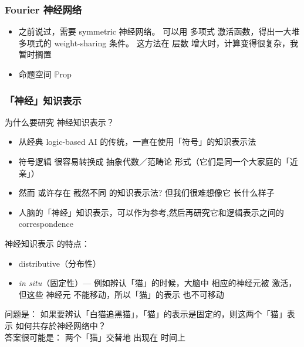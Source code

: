 \documentclass[16pt]{beamer}
\newcommand{\emp}[1]{{\color{violet}#1}}
\begin{document}
\begin{frame}
\frametitle{Fourier 神经网络}
\begin{itemize}
	\item 之前说过，需要 symmetric 神经网络。 可以用 \emp{多项式} 激活函数，得出一大堆 多项式的 weight-sharing 条件。 这方法在 层数 增大时，计算变得很复杂，我暂时搁置
	
	\item 命题空间 $\mathbb{P}\mathrm{rop}$
\end{itemize}
\end{frame}

\begin{frame}
\frametitle{「神经」知识表示}
为什么要研究 神经知识表示？
\begin{itemize}
	\item 从经典 logic-based AI 的传统，一直在使用「符号」的知识表示法

	\item 符号逻辑 很容易转换成 抽象代数／范畴论 形式（它们是同一个大家庭的「近亲」）
	
	\item 然而 或许存在 截然不同 的知识表示法? 但我们很难想像它 \emp{长什么样子}

	\item 人脑的「神经」知识表示，可以作为参考,然后再研究它和逻辑表示之间的 correspondence
\end{itemize}

\vspace*{0.4cm} 神经知识表示 的特点：
\begin{itemize}
	\item distributive（分布性）
	
	\item \textit{in situ}（固定性）--- 例如辨认「猫」的时候，大脑中 相应的神经元被 激活，但这些 神经元 \emp{不能移动}，所以「猫」的表示 也不可移动
\end{itemize}
问题是： 如果要辨认「白猫追黑猫」，「猫」的表示是固定的，则这两个「猫」表示 如何\emp{共存}於神经网络中？\\
答案很可能是： 两个「猫」\emp{交替}地 出现在 \emp{时间}上
\end{frame}
\end{document}
